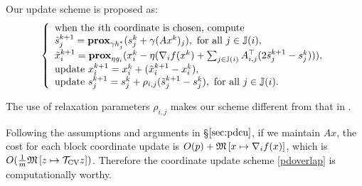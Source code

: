 {{{%
Our update scheme is proposed as: 
\begin{equation}
\left\{
\begin{array}{l}
\text{when the }i\text{th coordinate is chosen, compute}\\
\tilde{s}_j^{k+1}=\prox_{\gamma h_j^*} (s_j^k+\gamma (Ax^k)_j),~\mbox{for all}~ j\in\JJ(i),\\
\tilde{x}_i^{k+1}=\prox_{\eta g_i}(x_i^k-\eta(\nabla_i f(x^k)+\sum_{j\in\JJ(i)}A_{i,j}^\top(2\tilde{s}_j^{k+1}-s_j^k))),\\
\text{update }x_i^{k+1}=x_i^k+(\tilde{x}_i^{k+1}-x_i^k), \\
\text{update }s_j^{k+1}=s_j^k+\rho_{i,j}(\tilde{s}_j^{k+1}-s_j^k),~\mbox{for all}~ j\in\JJ(i).
\end{array}
\right.\label{pdoverlap}
\end{equation}
\begin{remark}
The use of relaxation parameters $\rho_{i,j}$ makes our scheme different from that in \cite{pesquet2014class}. %
\end{remark}
Following the assumptions and arguments in \S$\ref{sec:pdcu}$, if we maintain $Ax$, the cost for each block coordinate update is $O(p)+\mathfrak{M}\left[{x}\mapsto {\nabla_i f(x)}\right]$, which is $O(\frac{1}{m}\mathfrak{M}\left[{z}\mapsto {{{\mathcal{T}}_{\textnormal{CV}}}z}\right])$. Therefore the coordinate update scheme \eqref{pdoverlap} is computationally worthy.

}}}

